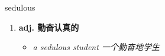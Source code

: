 
\begin{frame}
{\huge sedulous}
\begin{center}
\begin{enumerate}\Large
  \item \textbf{adj. 勤奋认真的}
  \begin{itemize}
    \item \em{\Large{a sedulous student 一个勤奋地学生}}
  \end{itemize}
\end{enumerate}
\end{center}
\end{frame}
